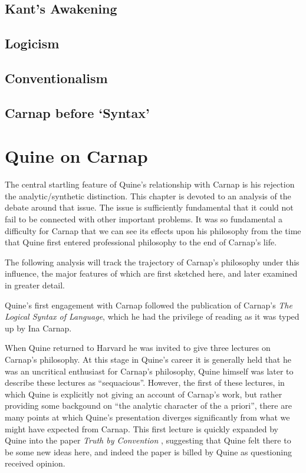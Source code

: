 \section{Kant's Awakening}

\section{Logicism}

\section{Conventionalism}

\section{Carnap before `Syntax'}

\chapter{Quine on Carnap}

\nocite{carnap56,carnap63,copi67,quine53,quine61, quine61a,quine66,quine86}

The central startling feature of Quine's relationship with
Carnap is his rejection the analytic/synthetic distinction.
This chapter is devoted to an analysis of the debate around
that issue.
The issue is sufficiently fundamental that it could not fail
to be connected with other important problems.
It was so fundamental a difficulty for Carnap that we can
see its effects upon his philosophy from the time that Quine
first entered professional philosophy to the end of Carnap's
life.

The following analysis will track the trajectory of Carnap's
philosophy under this influence, the major features of which
are first sketched here, and later examined in greater detail.

Quine's first engagement with Carnap followed the publication
of Carnap's {\it The Logical Syntax of Language}\cite{carnap37},
which he had the privilege of reading as it was typed up by
Ina Carnap.

When Quine returned to Harvard he was invited to give three
lectures on Carnap's philosophy.  
At this stage in Quine's career it is generally held that
he was an uncritical enthusiast for Carnap's philosophy,
Quine himself was later to describe these lectures as ``sequacious''.
However, the first of these lectures, in which Quine is explicitly
not giving an account of Carnap's work, but rather providing some
backgound on ``the analytic character of the a priori'', there
are many points at which Quine's presentation diverges significantly
from what we might have expected from Carnap.
This first lecture is quickly expanded by Quine into the paper
{\it Truth by Convention} \cite{quine36}, suggesting that Quine
felt there to be some new ideas here, and indeed the paper is
billed by Quine as questioning received opinion.


